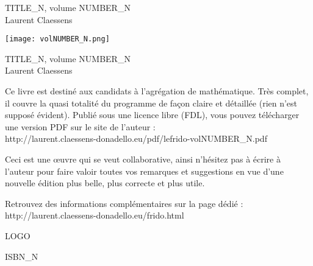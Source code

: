 \documentclass[a4paper,twoside,11pt]{book}
\begin{document}
 

\pagestyle{empty}

\begin{center}
    {\Large TITLE_N, volume NUMBER_N }\\
    Laurent Claessens
\end{center}

\vspace{3cm}

\begin{center}
    \texttt{[image: volNUMBER\_N.png]}
\end{center}

\newpage

\noindent
\Large
TITLE_N, volume NUMBER_N\\
\noindent
\large
Laurent Claessens

\normalsize

\vspace{4cm}

\noindent
Ce livre est destiné aux candidats à l'agrégation de mathématique. Très complet, il couvre la quasi totalité du programme de façon claire et détaillée (rien n'est supposé évident). Publié sous une licence libre (FDL), vous pouvez télécharger une version PDF sur le site de l'auteur :\\
http://laurent.claessens-donadello.eu/pdf/lefrido-volNUMBER_N.pdf 

\noindent
Ceci est une œuvre qui se veut collaborative, ainsi n'hésitez pas à écrire à l'auteur pour faire valoir toutes vos remarques et suggestions en vue d'une nouvelle édition plus belle, plus correcte et plus utile.

\noindent
Retrouvez des informations complémentaires sur la page dédié :\\
http://laurent.claessens-donadello.eu/frido.html

\vfill

LOGO

ISBN_N
\end{document}
